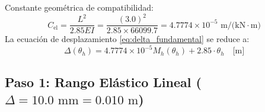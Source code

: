 \documentclass[11pt,letterpaper]{article}
\begin{document}
Constante geométrica de compatibilidad:
\begin{equation}
C_{\text{el}} = \frac{L^2}{2.85 E I} = \frac{(3.0)^2}{2.85 \times 66099.7} = 4.7774 \times 10^{-5}\text{ m/(kN}\cdot\text{m)}
\end{equation}
La ecuación de desplazamiento \eqref{eq:delta_fundamental} se reduce a:
\begin{equation}
\Delta(\theta_h) = 4.7774 \times 10^{-5} M_h(\theta_h) + 2.85 \cdot \theta_h \quad \text{[m]}
\end{equation}

\subsection{Paso 1: Rango Elástico Lineal (\texorpdfstring{$\Delta = 10.0\text{ mm} = 0.010\text{ m}$}{Delta = 10.0 mm})}
\end{document}
